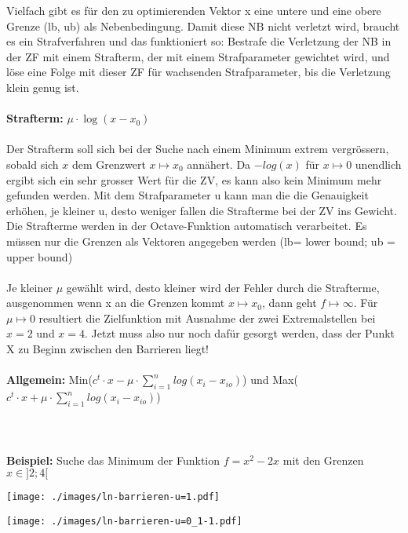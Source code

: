Vielfach gibt es für den zu optimierenden Vektor x eine untere und eine obere Grenze (lb, ub) als Nebenbedingung. Damit diese NB nicht verletzt wird, braucht es ein Strafverfahren und das funktioniert so: Bestrafe die Verletzung der NB in der ZF mit einem Strafterm, der mit einem Strafparameter gewichtet wird, und löse eine Folge mit dieser ZF für wachsenden Strafparameter, bis die Verletzung klein genug ist.\\
\\
\textbf{Strafterm: } $\mu \cdot \log{(x-x_0)}$\\
\\
Der Strafterm soll sich bei der Suche nach einem Minimum extrem vergrössern, sobald sich $x$ dem Grenzwert $x \mapsto x_0$ annähert. Da $-log(x)$ für $x\mapsto 0$ unendlich ergibt sich ein sehr grosser Wert für die ZV, es kann also kein Minimum mehr gefunden werden. Mit dem Strafparameter u kann man die die Genauigkeit erhöhen, je kleiner u, desto weniger fallen die Strafterme bei der ZV ins Gewicht. Die Strafterme werden in der Octave-Funktion automatisch verarbeitet. Es müssen nur die Grenzen als Vektoren angegeben werden (lb= lower bound; ub = upper bound)
\\
\\
Je kleiner $\mu$ gewählt wird, desto kleiner wird der Fehler durch die Strafterme, ausgenommen wenn x an die Grenzen kommt $x \mapsto x_0$, dann geht $f \mapsto \infty$. Für $\mu \mapsto 0$ resultiert die Zielfunktion mit Ausnahme der zwei Extremalstellen bei $x=2$ und $x=4$. Jetzt muss also nur noch dafür gesorgt werden, dass der Punkt X zu Beginn zwischen den Barrieren liegt!	
\\
\\
\textbf{Allgemein:} Min($c^t \cdot x - \mu \cdot \sum_{i=1}^n{log(x_i - x_{io})}$)    und    Max($c^t \cdot x + \mu \cdot \sum_{i=1}^n{log(x_i - x_{io})}$)
\\
\\
\\
\\
\textbf{Beispiel:} Suche das Minimum der Funktion $f=x^2-2x$ mit den Grenzen $x\in]2;4[$\\
\begin{minipage}[t]{6.0cm}
\texttt{[image: ./images/ln-barrieren-u=1.pdf]}\\
	\end{minipage}
	\hspace{0.1cm}
	\begin{minipage}[t]{6.0cm}	
\texttt{[image: ./images/ln-barrieren-u=0\_1-1.pdf]}\\
	\end{minipage}
